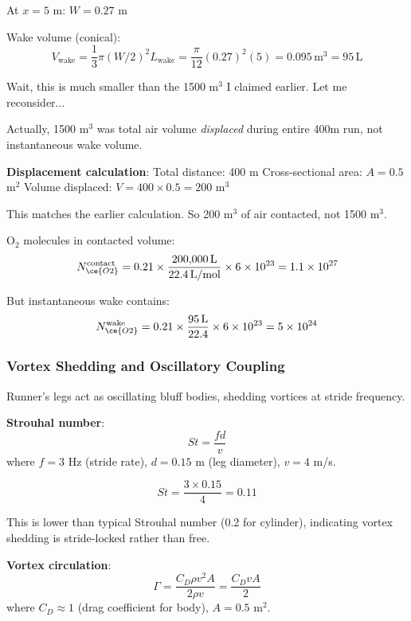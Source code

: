 \documentclass[11pt,onecolumn]{article}
\begin{document}
At $x = 5$ m: $W = 0.27$ m

Wake volume (conical):
\begin{equation}
V_{\text{wake}} = \frac{1}{3}\pi (W/2)^2 L_{\text{wake}} = \frac{\pi}{12}(0.27)^2(5) = 0.095\,\text{m}^3 = 95\,\text{L}
\end{equation}

Wait, this is much smaller than the 1500 m$^3$ I claimed earlier. Let me reconsider...

Actually, 1500 m$^3$ was total air volume \textit{displaced} during entire 400m run, not instantaneous wake volume.

\textbf{Displacement calculation}:
Total distance: 400 m
Cross-sectional area: $A = 0.5$ m$^2$
Volume displaced: $V = 400 \times 0.5 = 200$ m$^3$

This matches the earlier calculation. So 200 m$^3$ of air contacted, not 1500 m$^3$.

O$_2$ molecules in contacted volume:
\begin{equation}
N_{\ce{O2}}^{\text{contact}} = 0.21 \times \frac{200{,}000\,\text{L}}{22.4\,\text{L/mol}} \times 6 \times 10^{23} = 1.1 \times 10^{27}
\end{equation}

But instantaneous wake contains:
\begin{equation}
N_{\ce{O2}}^{\text{wake}} = 0.21 \times \frac{95\,\text{L}}{22.4} \times 6 \times 10^{23} = 5 \times 10^{24}
\end{equation}

\subsubsection{Vortex Shedding and Oscillatory Coupling}

Runner's legs act as oscillating bluff bodies, shedding vortices at stride frequency.

\textbf{Strouhal number}:
\begin{equation}
St = \frac{f d}{v}
\end{equation}
where $f = 3$ Hz (stride rate), $d = 0.15$ m (leg diameter), $v = 4$ m/s.

\begin{equation}
St = \frac{3 \times 0.15}{4} = 0.11
\end{equation}

This is lower than typical Strouhal number (0.2 for cylinder), indicating vortex shedding is stride-locked rather than free.

\textbf{Vortex circulation}:
\begin{equation}
\Gamma = \frac{C_D \rho v^2 A}{2\rho v} = \frac{C_D v A}{2}
\end{equation}
where $C_D \approx 1$ (drag coefficient for body), $A = 0.5$ m$^2$.
\end{document}
